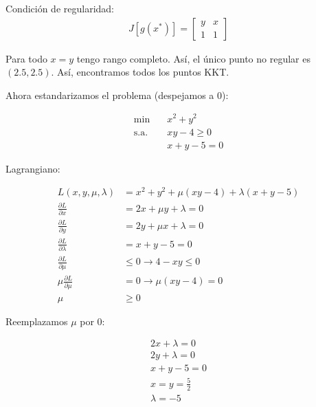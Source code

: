 \documentclass{article}
\newenvironment{solution}
{\begin{mdframed}[backgroundcolor=lightorange,hidealllines=true]}
{\end{mdframed}}
\begin{document}
\begin{solution}
    Condición de regularidad:
    \begin{align*}
        J[g(x^*)] = \begin{bmatrix}
                        y & x \\
                        1 & 1
                    \end{bmatrix}
    \end{align*}

    Para todo $x=y$ tengo rango completo. Así, el único punto no regular es $(2.5,2.5)$. Así, encontramos todos los puntos KKT.

    Ahora estandarizamos el problema (despejamos a 0):

    \begin{align*}
        \min \quad        & x^2+y^2    \\
        \text{s.a.} \quad & xy-4\geq 0 \\
                          & x+y-5=0
    \end{align*}

    Lagrangiano:

    \begin{align*}
        L(x,y,\mu, \lambda)                 & = x^2+y^2 + \mu(xy-4) + \lambda(x+y-5) \\
        \frac{\partial L}{\partial x}       & = 2x + \mu y + \lambda = 0             \\
        \frac{\partial L}{\partial y}       & = 2y + \mu x + \lambda = 0             \\
        \frac{\partial L}{\partial \lambda} & = x + y - 5= 0                         \\
        \frac{\partial L}{\partial \mu}     & \leq 0 \to 4-xy \leq 0                 \\
        \mu\frac{\partial L}{\partial \mu}  & = 0 \to \mu(xy-4) = 0                  \\
        \mu                                 & \geq 0
    \end{align*}

    Reemplazamos $\mu$ por $0$:

    \begin{align*}
        2x + \lambda = 0 \\
        2y + \lambda = 0 \\
        x + y - 5 = 0    \\
        x=y= \frac{5}{2} \\
        \lambda = -5
    \end{align*}


\end{solution}
\end{document}
